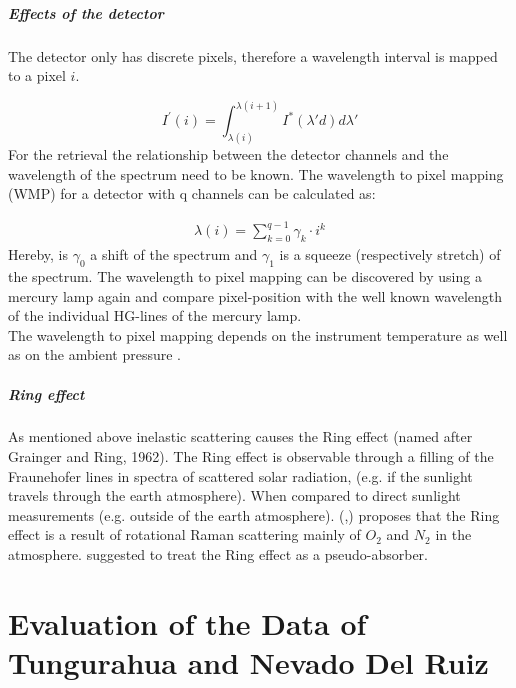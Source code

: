 \documentclass  [
  paper    = a4,
  BCOR     = 10mm,
  twoside,
  fontsize = 12pt,
  fleqn,
  toc      = bibnumbered,
  toc      = listofnumbered,
  numbers  = noendperiod,
  headings = normal,
  listof   = leveldown,
  version  = 3.03
]                                       {scrreprt}
\begin{document}
	\subsubsection*{Effects of the detector}
	The detector only has discrete pixels, therefore a wavelength interval is mapped to a pixel $i$.
	
	\begin{equation}
	I^{'}\left(i\right) = \int_{\lambda(i)}^{\lambda(i+1)}I^{*}\left(\lambda{'}d\right)d\lambda{'}
	\end{equation}
	For the retrieval the relationship between the detector channels and the wavelength of the spectrum need to be known.
	The wavelength to pixel mapping (WMP) for a detector with q channels can be calculated as:

	\begin{eqnarray}
	\lambda(i) = \sum_{k=0}^{q-1}\gamma_{k}\cdot i^{k}
	\end{eqnarray}
	Hereby, is $\gamma_{0}$ a shift of the spectrum and $\gamma_{1}$ is a squeeze (respectively stretch) of the spectrum.
	The wavelength to pixel mapping can be discovered by using a mercury lamp again and compare pixel-position with the well known wavelength of the individual HG-lines of the mercury lamp.\\
	The wavelength to pixel mapping depends on the instrument temperature as well as on the ambient pressure \citep{lubcke2014bro}.
	\subsubsection*{Ring effect}
	As mentioned above inelastic scattering causes the Ring effect (named after Grainger and Ring, 1962).
	The Ring effect is observable through a filling of the Fraunehofer lines in spectra of scattered solar radiation, (e.g. if the sunlight travels through the earth atmosphere). When compared to direct sunlight measurements (e.g. outside of the earth atmosphere).
	(\cite{bussemer1993ring},\cite{solomon1987interpretation}) proposes that the Ring effect is a result of  rotational Raman scattering mainly of
	$O_2$ and $N_2$ in the atmosphere.
	\cite{solomon1987interpretation} suggested to treat the Ring effect as a pseudo-absorber. 


	
	\part{Evaluation of the Data of Tungurahua and Nevado Del Ruiz}
	
\end{document}

